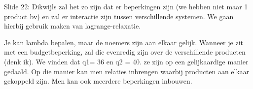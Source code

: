 \documentclass[10pt,a4paper]{report}
\begin{document}
Slide 22: Dikwijls zal het zo zijn dat er beperkingen zijn (we hebben niet maar 1 product bv) en zal er interactie zijn tussen verschillende systemen. We gaan hierbij gebruik maken van lagrange-relaxatie. 

















































Je kan lambda bepalen, maar de noemers zijn aan elkaar gelijk. Wanneer je zit met een budgetbeperking, zal die evenredig zijn over de verschillende producten (denk ik).
We vinden dat q1= 36 en q2 = 40. ze zijn op een gelijkaardige manier gedaald. 
Op die manier kan men relaties inbrengen waarbij producten aan elkaar gekoppeld zijn. Men kan ook meerdere beperkingen inbouwen.
\end{document}
